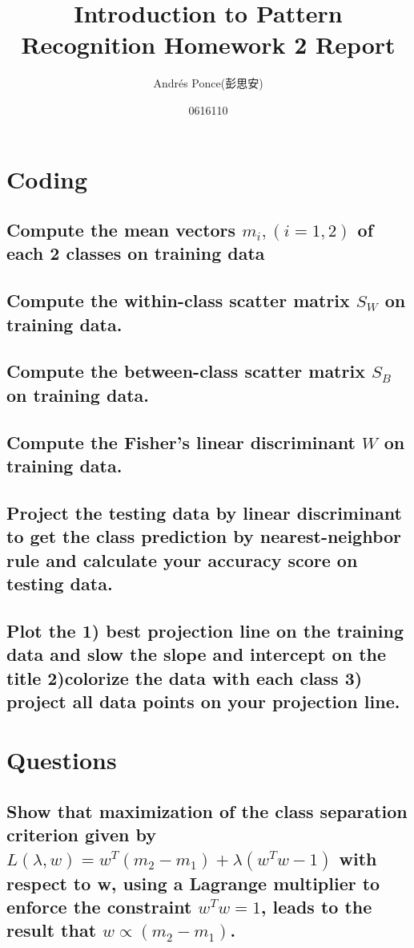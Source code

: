 \documentclass{article}
\title{Introduction to Pattern Recognition Homework 2 Report}
\author{Andr\'es Ponce(彭思安) \\
\and
0616110}
\begin{document}
\maketitle
\section{Coding}
	\subsection{Compute the mean vectors $m_{i},(i=1,2)$ of each 2 classes on training data}
	\subsection{Compute the within-class scatter matrix $S_{W}$ on training data.}
	\subsection{Compute the between-class scatter matrix $S_{B}$ on training data.}
	\subsection{Compute the Fisher's linear discriminant $W$ on training data.}
	\subsection{Project the testing data by linear discriminant to get the class prediction by
		nearest-neighbor rule and calculate your accuracy score on testing data.}
	\subsection{Plot the \textbf{1) best projection line} on the training data and slow the slope
		and intercept on the title \textbf{2)colorize the data} with each class \textbf{3) project
		all data points on your projection line}.}
\section{Questions}
	\subsection{Show that maximization of the class separation criterion given by 
		$L(\lambda, w) = w^{T}(m_{2} - m_{1})  + \lambda(w^{T}w - 1)$ with respect to w, using a
		Lagrange multiplier to enforce the constraint $w^{T}w = 1$, leads to the result that 
		$w \propto (m_{2} - m_{1})$.}
\end{document}
